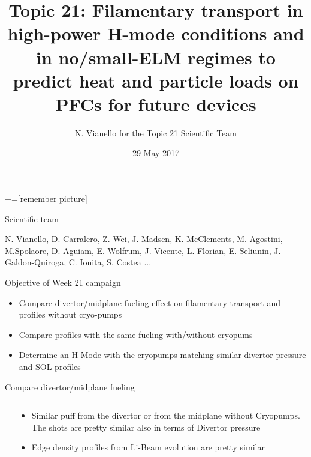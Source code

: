 \documentclass[10pt, compress]{beamer}
\title{{\small Topic 21: Filamentary transport in high-power H-mode conditions and in no/small-ELM regimes to predict heat and particle loads on PFCs for future devices }}
\date{29 May 2017}
\author[Topic 21 Scientific Team]{N. Vianello for the Topic 21 Scientific Team}
\newcommand\Fontvi{\fontsize{8}{7.2}\selectfont}
\begin{document}
+=[remember picture]
\maketitle
\begin{frame}{Scientific team}
  \begin{center}
N. Vianello, D. Carralero, Z. Wei, J. Madsen, K. McClements,
M. Agostini, M.Spolaore, D. Aguiam, E. Wolfrum, J. Vicente,
L. Florian, E. Seliunin, J. Galdon-Quiroga, C. Ionita, S. Costea ...
  \end{center}
\end{frame}
\begin{frame}{Objective of Week 21 campaign}
  \begin{itemize}[<+-|alert@+>]
    \item Compare divertor/midplane fueling effect on filamentary
      transport and profiles without cryo-pumps
    \item Compare profiles with the same fueling with/without cryopums
    \item Determine an H-Mode with the cryopumps matching similar
      divertor pressure and SOL profiles
  \end{itemize}    
\end{frame}
\begin{frame}{Compare divertor/midplane fueling}
\Fontvi
  \vspace{-1cm}
\begin{columns}
  \begin{column}{0.65\textwidth}
  \end{column}
  \begin{column}{0.35\textwidth}
    \begin{itemize}
      \item Similar puff from the divertor or from the midplane
        without Cryopumps. The
        shots are pretty similar also in terms of Divertor pressure
      \item<2-> Edge density profiles from Li-Beam evolution are
        pretty similar
    \end{itemize}
  
  \end{column}
\end{columns}
\end{frame}
\end{document}
